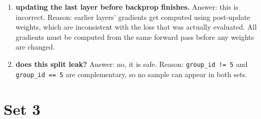 \documentclass[11pt]{article}
\begin{document}
\begin{enumerate}
\item \textbf{updating the last layer before backprop finishes.}
Answer: this is incorrect.
Reason: earlier layers' gradients get computed using post-update weights,
which are inconsistent with the loss that was actually evaluated. All
gradients must be computed from the same forward pass before any weights
are changed.

\item \textbf{does this split leak?}
Answer: no, it is safe.
Reason: \texttt{group\_id != 5} and \texttt{group\_id == 5} are
complementary, so no sample can appear in both sets.

\end{enumerate}

\section*{Set 3}
\end{document}
